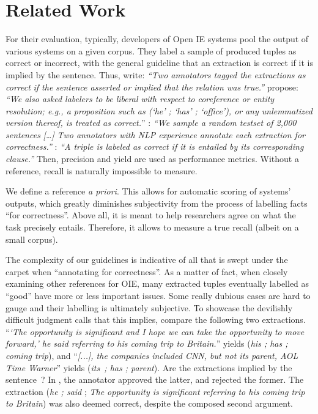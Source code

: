 \pdfoutput=1 \documentclass[11pt, a4paper]{article}
\begin{document}
\section{Related Work}
\label{sec:org385e7da}
For their evaluation, typically, developers of Open IE systems pool the
output of various systems on a given corpus. They label a sample of produced
tuples as correct or incorrect, with the general guideline that an
extraction is correct if it is implied by the sentence. Thus,
 write: \emph{``Two annotators tagged the extractions as
correct} \emph{if the sentence asserted or implied that the relation was true.''}
 propose: \emph{``We also asked
labelers to be liberal with respect to coreference or entity} \emph{resolution;
e.g., a proposition such as (`he' ; `has' ; `office'), or} \emph{any unlemmatized
version thereof, is treated as correct.}'' :
\emph{``We sample a random testset of 2,000 sentences} \emph{[\ldots{}]} \emph{Two annotators
with NLP experience annotate each extraction for correctness.''}
\citet{D17-1278}: \emph{``A triple is labeled as correct if it is entailed by its
corresponding clause.''} Then, precision and yield are used as performance
metrics. Without a reference, recall is naturally impossible to measure.

We define a reference \emph{a priori}. This allows for automatic scoring of
systems' outputs, which greatly diminishes subjectivity from the process of
labelling facts ``for correctness''. Above all, it is meant to help
researchers agree on what the task precisely entails. Therefore, it
allows to measure a true recall (albeit on a small corpus).

The complexity of our guidelines is indicative of all that is swept under
the carpet when ``annotating for correctness''. As a matter of fact, when
closely examining other references for OIE, many extracted tuples eventually
labelled as ``good'' have more or less important issues. Some really dubious
cases are hard to gauge and their labelling is ultimately subjective. To
showcase the devilishly difficult judgment calls that this implies, compare
the following two extractions. ``\textit{`The opportunity is
   significant and I hope we can take the opportunity to move forward,' he said
   referring to his coming trip to Britain.}'' yields (\emph{his ; has ; coming
trip}), and ``\textit{[...], the companies included CNN, but not its parent, AOL Time Warner}'' yields (\emph{its~; has ; parent}). Are the
extractions implied by the sentence~? In
\cite{DelCorro:2013:CCO:2488388.2488420}, the annotator approved the latter,
and rejected the former. The extraction (\emph{he ; said} ; \emph{The opportunity is
significant referring to his coming trip to Britain}) was also deemed
correct, despite the composed second argument.
\end{document}
